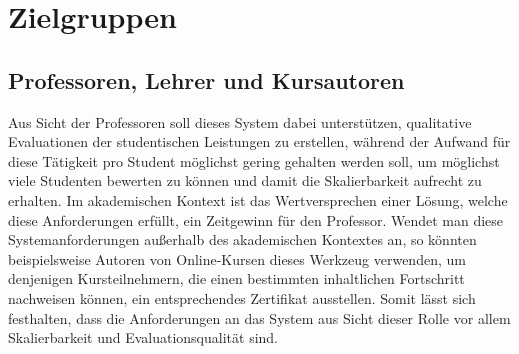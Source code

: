 \section{Zielgruppen}
\subsection{Professoren, Lehrer und Kursautoren}
Aus Sicht der Professoren soll dieses System dabei unterstützen, qualitative Evaluationen der studentischen Leistungen zu erstellen, während der Aufwand für diese Tätigkeit pro Student möglichst gering gehalten werden soll, um möglichst viele Studenten bewerten zu können und damit die Skalierbarkeit aufrecht zu erhalten. Im akademischen Kontext ist das Wertversprechen einer Lösung, welche diese Anforderungen erfüllt, ein Zeitgewinn für den Professor. Wendet man diese Systemanforderungen außerhalb des akademischen Kontextes an, so könnten beispielsweise Autoren von Online-Kursen dieses Werkzeug verwenden, um denjenigen Kursteilnehmern, die einen bestimmten inhaltlichen Fortschritt nachweisen können, ein entsprechendes Zertifikat ausstellen. Somit lässt sich festhalten, dass die Anforderungen an das System aus Sicht dieser Rolle vor allem Skalierbarkeit und Evaluationsqualität sind.

